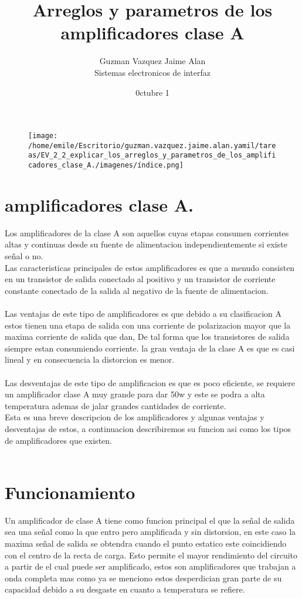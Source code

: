 \documentclass[12pt]{article}
\title{\textbf{Arreglos y parametros de los amplificadores clase A}}
\author{Guzman Vazquez Jaime Alan\\
Sistemas electronicos de interfaz}
\date{0ctubre 1}
\begin{document}
\begin{figure}[htp]
\centering
\texttt{[image: /home/emile/Escritorio/guzman.vazquez.jaime.alan.yamil/tareas/EV\_2\_2\_explicar\_los\_arreglos\_y\_parametros\_de\_los\_amplificadores\_clase\_A./imagenes/índice.png]}
\caption{}
\label{}
\end{figure}
\maketitle
\section{amplificadores clase A.}
Los amplificadores de la clase A son aquellos cuyas etapas consumen corrientes altas y continuas desde su fuente de alimentacion independientemente si existe señal o no.\\
Las caracteristicas principales de estos amplificadores es que a menudo consisten en un transistor de salida conectado al positivo y un transistor de corriente constante conectado de la salida al negativo de la fuente de alimentacion.\\\\
Las ventajas de este tipo de amplificadores  es que debido a su clasificacion A estos tienen una etapa de salida con una corriente  de polarizacion mayor que la maxima corriente de salida que dan, De tal forma que los transistores de salida siempre estan consumiendo corriente. la gran ventaja de la clase A es que es casi lineal y en consecuencia la distorcion es menor.\\\\
Las desventajas de este tipo de amplificacion es que es poco eficiente, se requiere un amplificador clase A muy grande para dar 50w y este se podra a alta temperatura ademas de jalar grandes cantidades de corriente.\\  

Esta es una breve descripcion de los amplificadores y algunas ventajas y desventajas de estos, a continuacion describiremos su funcion asi como los tipos de amplificadores que existen.\\\\

\maketitle
\section{Funcionamiento}
Un amplificador de clase A tiene como funcion principal el que la señal de salida sea una señal como la que entro pero amplificada y sin distorsion, en este caso la maxima señal de salida se obtendra cuando el punto estatico este coincidiendo con el centro de la recta de carga.
Esto permite el mayor rendimiento del circuito a partir de el cual puede ser amplificado, estos son amplificadores que trabajan a onda completa mas como ya se menciono estos desperdician gran parte de su capacidad debido a su desgaste en cuanto a temperatura se refiere.
\end{document}
